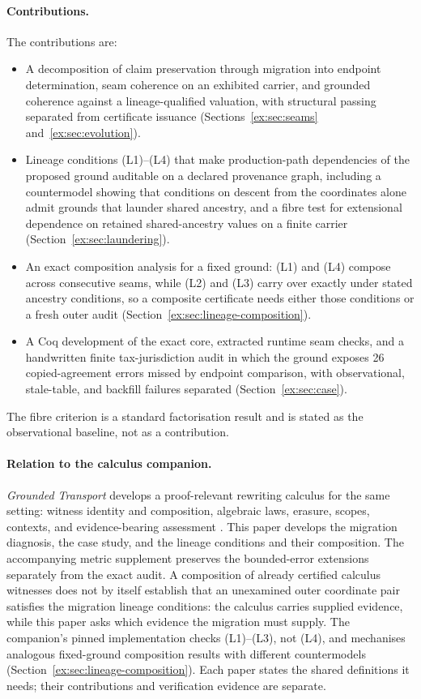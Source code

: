 \documentclass[11pt]{article}
\theoremstyle{definition}
\begin{document}
\paragraph{Contributions.} The contributions are:
\begin{itemize}
\item A decomposition of claim preservation through migration into endpoint determination, seam coherence on an exhibited carrier, and grounded coherence against a lineage-qualified valuation, with structural passing separated from certificate issuance (Sections~\ref{ex:sec:seams} and~\ref{ex:sec:evolution}).
\item Lineage conditions (L1)--(L4) that make production-path dependencies of the proposed ground auditable on a declared provenance graph, including a countermodel showing that conditions on descent from the coordinates alone admit grounds that launder shared ancestry, and a fibre test for extensional dependence on retained shared-ancestry values on a finite carrier (Section~\ref{ex:sec:laundering}).
\item An exact composition analysis for a fixed ground: (L1) and (L4) compose across consecutive seams, while (L2) and (L3) carry over exactly under stated ancestry conditions, so a composite certificate needs either those conditions or a fresh outer audit (Section~\ref{ex:sec:lineage-composition}).
\item A Coq development of the exact core, extracted runtime seam checks, and a handwritten finite tax-jurisdiction audit in which the ground exposes 26 copied-agreement errors missed by endpoint comparison, with observational, stale-table, and backfill failures separated (Section~\ref{ex:sec:case}).
\end{itemize}
The fibre criterion is a standard factorisation result and is stated as the observational baseline, not as a contribution.

\paragraph{Relation to the calculus companion.} \emph{Grounded Transport} develops a proof-relevant rewriting calculus for the same setting: witness identity and composition, algebraic laws, erasure, scopes, contexts, and evidence-bearing assessment \citep{moore2026transport}. This paper develops the migration diagnosis, the case study, and the lineage conditions and their composition. The accompanying metric supplement preserves the bounded-error extensions separately from the exact audit. A composition of already certified calculus witnesses does not by itself establish that an unexamined outer coordinate pair satisfies the migration lineage conditions: the calculus carries supplied evidence, while this paper asks which evidence the migration must supply. The companion's pinned implementation checks (L1)--(L3), not (L4), and mechanises analogous fixed-ground composition results with different countermodels (Section~\ref{ex:sec:lineage-composition}). Each paper states the shared definitions it needs; their contributions and verification evidence are separate.
\end{document}
